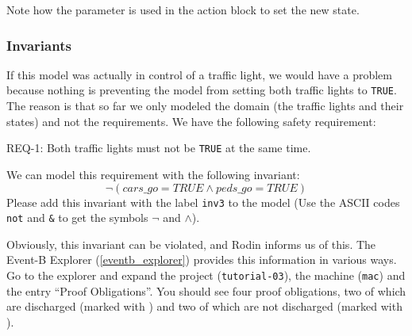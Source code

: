 Note how the parameter is used in the action block to set the new state.

\subsubsection{Invariants}
\label{tutorial:invariants}

If this model was actually in control of a traffic light, we would have a problem because nothing is preventing the model from setting both traffic lights to \texttt{TRUE}.  The reason is that so far we only modeled the domain (the traffic lights and their states) and not the requirements.  We have the following safety requirement:

\begin{center}REQ-1: Both traffic lights must not be \texttt{TRUE} at the same time.\end{center}

We can model this requirement with the following invariant:
\[
\lnot  (cars\_go = TRUE \land  peds\_go = TRUE)
\]
Please add this invariant with the label \texttt{inv3} to the model (Use the ASCII codes \texttt{not} and \texttt{\&} to get the symbols $\lnot$ and $\land$).

Obviously, this invariant can be violated, and Rodin informs us of this.  The \textsf{Event-B Explorer} (\ref{eventb_explorer}) provides this information in various ways.  Go to the explorer and expand the project (\texttt{tutorial-03}), the machine (\texttt{mac}) and the entry ``Proof Obligations''.
You should see four proof obligations, two of which are discharged (marked with ) and two of which are not discharged (marked with ).


